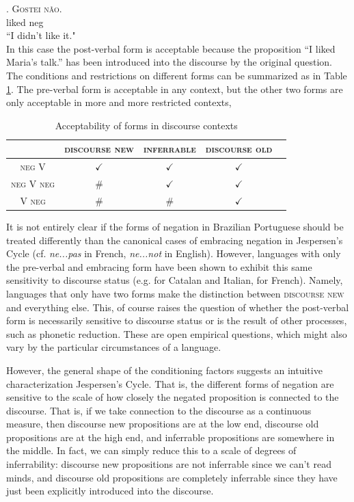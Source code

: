 \documentclass[12pt]{upenndiss}
\theoremstyle{definition} \newtheorem{definition}{Definition}
\begin{document}
\exg. \textsc{\color{green}Gostei} \textsc{\color{green}n{\~a}o}.\\
	  liked neg\\
	 ``I didn't like it."\\

In this case the post-verbal form is acceptable because the proposition ``I liked Maria's talk.'' has been introduced into the discourse by the original question. The conditions and restrictions on different forms can be summarized as in Table \ref{schwenter}. The pre-verbal form is acceptable in any context, but the other two forms are only acceptable in more and more restricted contexts,

\begin{table}
\begin{center}
\begin{tabular}{@{}ccccc@{}}
      \hline
       & \textsc{discourse new} & \textsc{inferrable} & \textsc{discourse old}\\ \hline
      \textsc{\color{red} neg V} & $\checkmark$ &  $\checkmark$ &  $\checkmark$ \\
      \textsc{\color{blue} neg V neg} & \#  & $\checkmark$ & $\checkmark$ \\
      \textsc{\color{green} V neg} & \#  & \#  & $\checkmark$ \\
      \hline
\end{tabular}     
\end{center}
\caption{Acceptability of forms in discourse contexts}     
\label{schwenter}
\end{table}


It is not entirely clear if the forms of negation in Brazilian Portuguese should be treated differently than the canonical cases of embracing negation in Jespersen's Cycle (cf. \emph{ne...pas} in French, \emph{ne...not} in English). However, languages with only the pre-verbal and embracing form have been shown to exhibit this same sensitivity to discourse status (e.g. \cite{schwenter2006} for Catalan and Italian, \cite{hansen2009} for French). Namely, languages that only have two forms make the distinction between \textsc{discourse new} and everything else. This, of course raises the question of whether the post-verbal form is necessarily sensitive to discourse status or is the result of other processes, such as phonetic reduction. These are open empirical questions, which might also vary by the particular circumstances of a language.

However, the general shape of the conditioning factors suggests an intuitive characterization Jespersen's Cycle. That is, the different forms of negation are sensitive to the scale of how closely the negated proposition is connected to the discourse. That is, if we take connection to the discourse as a continuous measure, then discourse new propositions are at the low end, discourse old propositions are at the high end, and inferrable propositions are somewhere in the middle. In fact, we can simply reduce this to a scale of degrees of inferrability: discourse new propositions are not inferrable since we can't read minds, and discourse old propositions are completely inferrable since they have just been explicitly introduced into the discourse. 
\end{document}
